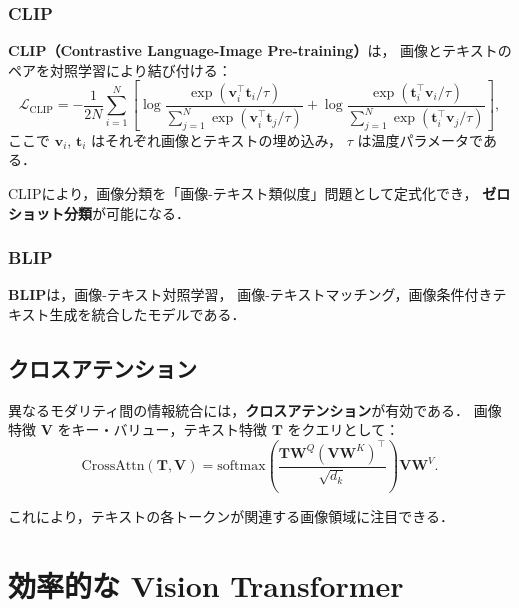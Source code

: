 \subsubsection{CLIP}

\textbf{CLIP（Contrastive Language-Image Pre-training）}\cite{Radford2021}は，
画像とテキストのペアを対照学習により結び付ける：
\begin{equation}
  \mathcal{L}_{\mathrm{CLIP}} = -\frac{1}{2N} \sum_{i=1}^{N} \left[
    \log \frac{\exp(\boldsymbol{v}_i^\top \boldsymbol{t}_i / \tau)}{\sum_{j=1}^{N} \exp(\boldsymbol{v}_i^\top \boldsymbol{t}_j / \tau)}
    + \log \frac{\exp(\boldsymbol{t}_i^\top \boldsymbol{v}_i / \tau)}{\sum_{j=1}^{N} \exp(\boldsymbol{t}_i^\top \boldsymbol{v}_j / \tau)}
  \right],
  \label{eq:clip-loss}
\end{equation}
ここで $\boldsymbol{v}_i$, $\boldsymbol{t}_i$ はそれぞれ画像とテキストの埋め込み，
$\tau$ は温度パラメータである．

CLIPにより，画像分類を「画像-テキスト類似度」問題として定式化でき，
\textbf{ゼロショット分類}が可能になる．

\subsubsection{BLIP}

\textbf{BLIP}\cite{Li2022}は，画像-テキスト対照学習，
画像-テキストマッチング，画像条件付きテキスト生成を統合したモデルである．

\subsection{クロスアテンション}

異なるモダリティ間の情報統合には，\textbf{クロスアテンション}が有効である．
画像特徴 $\mathbf{V}$ をキー・バリュー，テキスト特徴 $\mathbf{T}$ をクエリとして：
\begin{equation}
  \mathrm{CrossAttn}(\mathbf{T}, \mathbf{V}) = \mathrm{softmax}\left(\frac{\mathbf{T} \mathbf{W}^Q (\mathbf{V} \mathbf{W}^K)^\top}{\sqrt{d_k}}\right) \mathbf{V} \mathbf{W}^V.
  \label{eq:cross-attention}
\end{equation}

これにより，テキストの各トークンが関連する画像領域に注目できる．

\section{効率的な Vision Transformer}
\label{sec:efficient-vit}

